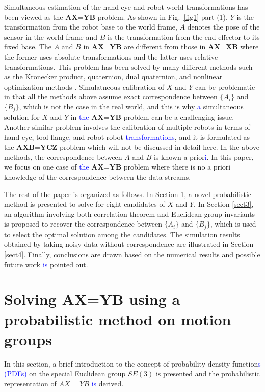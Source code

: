 \documentclass[letterpaper, 10 pt, conference]{ieeeconf}  %
\begin{document}
Simultaneous estimation of the hand-eye and robot-world transformations has been viewed as the $\textbf{AX=YB}$ problem. As shown in Fig.~\ref{fig1} part (1), $Y$ is the transformation from the robot base to the world frame, $A$ denotes the pose of the sensor in the world frame and $B$ is the transformation from the end-effector to its fixed base. The $A$ and $B$ in $\textbf{AX=YB}$ are different from those in $\textbf{AX=XB}$ where the former uses absolute transformations and the latter uses relative transformations. This problem has been solved by many different methods such as the Kronecker product, quaternion, dual quaternion, and nonlinear optimization methods \cite{Zhuang1994,dornaika1998simultaneous,Hirsh2001, ernst2012non,strobl2006optimal,Li2010,Shah2013,Heller2014}. Simulatneous calibration %
of $X$ and $Y$ can be problematic in that all the methods above assume exact correspondence between $\{A_i\}$ and $\{B_j\}$, which is not the case in the real world, and this is why \textcolor{blue}{a} simultaneous solution for $X$ and $Y$ in \textcolor{blue}{the} $\textbf{AX=YB}$ problem can be a challenging issue. Another similar problem involves the calibration of multiple robots in terms of hand-eye, tool-flange\textcolor{blue}{,} and robot-robot \textcolor{blue}{transformations}, %
 and it is formulated as the $\textbf{AXB=YCZ}$ problem \cite{Wang2014} which will not be discussed in detail here. In the above methods, the correspondence between $A$ and $B$ is known a prior\textcolor{blue}{i}. In this paper, we focus on one case of \textcolor{blue}{the} $\textbf{AX=YB}$ problem where there is no a priori knowledge of the correspondence between the data streams.

The rest of the paper is organized as follows. {\color{red}In Section
\ref{sect2}, a novel probabilistic method is presented to solve for eight candidates of $X$ and $Y$.} In Section \ref{sect3}, an algorithm involving both correlation theorem and Euclidean group invariants is proposed to recover the correspondence between $\{A_i\}$ and $\{B_j\}$, {\color{red} which is used to select the optimal solution among the candidates}. The simulation results obtained by taking noisy data without correspondence are illustrated in Section \ref{sect4}. Finally, conclusions are drawn based on the numerical results and possible future work \textcolor{blue}{is} %
pointed out.

\section{Solving AX=YB using a probabilistic method on motion groups}
\label{sect2}
In this section, a brief introduction to the concept %
 of probability density function\textcolor{blue}{s (PDFs)} on the special Euclidean group $SE(3)$ is presented and the probabilistic representation of $AX=YB$ \textcolor{blue}{is} %
  derived.
\end{document}
